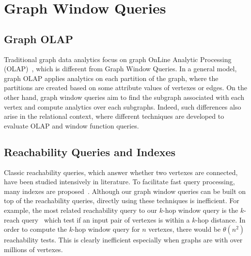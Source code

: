 \section{Graph Window Queries}

\subsection{Graph OLAP}
Traditional graph data analytics focus on
graph OnLine Analytic Processing (OLAP)~\cite{zhao2011graph,wang2014pagrol,chen2008graph,tian2008efficient},
which is different from Graph Window Queries.
In a general model, graph OLAP applies analytics on each partition
of the graph, where the partitions are created based on some
attribute values of vertexes or edges. On the other hand, graph
window queries aim to find the subgraph associated with each vertex
and compute analytics over each subgraphs. Indeed, such differences also arise in the relational context, where different 
techniques are developed to evaluate OLAP and window function queries.


%
%

\subsection{Reachability Queries and Indexes}
Classic reachability queries, which
answer whether two vertexes are connected, have 
been studied intensively in literature. 
To facilitate fast query processing, many indexes are
proposed~\cite{yu2010graph,cheng2012k}. Although our graph window queries
can be built on top of the reachability queries, directly
using these techniques is inefficient. For example, the
most related reachability
query to our $k$-hop window query is the $k$-reach query~\cite{cheng2012k} which
test if an input pair of vertexes is within a $k$-hop distance. In order
to compute the $k$-hop window query for $n$ vertexes, there would be $\theta(n^2)$
reachability tests. This is clearly inefficient especially when graphs
are with over millions of vertexes.

